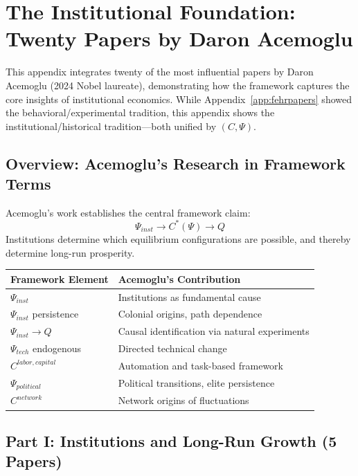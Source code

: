 \section{The Institutional Foundation: Twenty Papers by Daron Acemoglu}
\label{app:acemoglu}

This appendix integrates twenty of the most influential papers by Daron Acemoglu
(2024 Nobel laureate), demonstrating how the framework captures the core
insights of institutional economics. While Appendix~\ref{app:fehrpapers}
showed the behavioral/experimental tradition, this appendix shows the
institutional/historical tradition---both unified by $(C, \Psi)$.

\subsection{Overview: Acemoglu's Research in Framework Terms}

Acemoglu's work establishes the central framework claim:
\begin{equation}
  \Psi_{inst} \to C^*(\Psi) \to Q
\end{equation}
Institutions determine which equilibrium configurations are possible,
and thereby determine long-run prosperity.

\begin{center}
\renewcommand{\arraystretch}{1.2}
\small
\begin{tabular}{ll}
\hline
\textbf{Framework Element} & \textbf{Acemoglu's Contribution} \\
\hline
$\Psi_{inst}$ & Institutions as fundamental cause \\
$\Psi_{inst}$ persistence & Colonial origins, path dependence \\
$\Psi_{inst} \to Q$ & Causal identification via natural experiments \\
$\Psi_{tech}$ endogenous & Directed technical change \\
$C^{labor,capital}$ & Automation and task-based framework \\
$\Psi_{political}$ & Political transitions, elite persistence \\
$C^{network}$ & Network origins of fluctuations \\
\hline
\end{tabular}
\end{center}

\subsection{Part I: Institutions and Long-Run Growth (5 Papers)}


